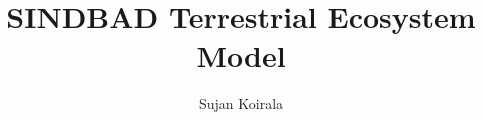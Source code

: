 \documentclass[12pt,oneside]{practicum-report}
\renewcommand{\baselinestretch}{1.5}
\begin{document}
\frontmatter

\title[A Model Description]{SINDBAD Terrestrial Ecosystem Model}
\author{Sujan Koirala}





\tableofcontents

\mainmatter






\appendix

%


\end{document}
